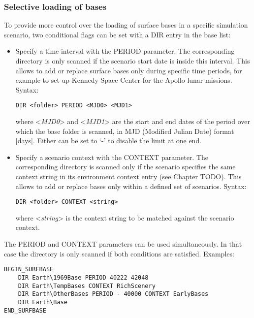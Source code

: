 \documentclass[Orbiter Developer Manual.tex]{subfiles}
\begin{document}
\subsubsection*{Selective loading of bases}
To provide more control over the loading of surface bases in a specific simulation scenario, two conditional flags can be set with a DIR entry in the base list:

\begin{itemize}
\item Specify a time interval with the PERIOD parameter. The corresponding directory is only scanned if the scenario start date is inside this interval. This allows to add or replace surface bases only during specific time periods, for example to set up Kennedy Space Center for the Apollo lunar missions. Syntax:

\begin{lstlisting}[language=OSFS]
DIR <folder> PERIOD <MJD0> <MJD1>
\end{lstlisting}

\noindent
where <\textit{MJD0}> and <\textit{MJD1}> are the start and end dates of the period over which the base folder is scanned, in MJD (Modified Julian Date) format [days]. Either can be set to ‘-’ to disable the limit at one end.
\item Specify a scenario context with the CONTEXT parameter. The corresponding directory is scanned only if the scenario specifies the same context string in its environment context entry (see Chapter TODO). This allows to add or replace bases only within a defined set of scenarios. Syntax:

\begin{lstlisting}[language=OSFS]
DIR <folder> CONTEXT <string>
\end{lstlisting}

\noindent
where <\textit{string}> is the context string to be matched against the scenario context.
\end{itemize}

\noindent
The PERIOD and CONTEXT parameters can be used simultaneously. In that case the directory is only scanned if both conditions are satisfied. Examples:
\begin{lstlisting}[language=OSFS]
BEGIN_SURFBASE
	DIR Earth\1969Base PERIOD 40222 42048
	DIR Earth\TempBases CONTEXT RichScenery
	DIR Earth\OtherBases PERIOD - 40000 CONTEXT EarlyBases
	DIR Earth\Base
END_SURFBASE
\end{lstlisting}
\end{document}
